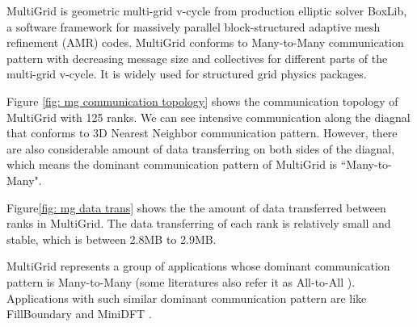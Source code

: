 \documentclass[conference]{IEEEtran}
\begin{document}
MultiGrid is geometric multi-grid v-cycle from production elliptic solver BoxLib, a software framework for massively parallel block-structured adaptive mesh refinement (AMR) codes. MultiGrid conforms to Many-to-Many communication pattern with decreasing message size and collectives for different parts of the multi-grid v-cycle. It is widely used for structured grid physics packages. 

Figure \ref{fig: mg communication topology} shows the communication topology of MultiGrid with 125 ranks. We can see intensive communication along the diagnal that conforms to 3D Nearest Neighbor communication pattern. However, there are also considerable amount of data transferring on both sides of the diagnal, which means the dominant communication pattern of MultiGrid is ``Many-to-Many".

Figure\ref{fig: mg data trans} shows the the amount of data transferred between ranks in MultiGrid. The data transferring of each rank is relatively small and stable, which is between 2.8MB to 2.9MB. 

MultiGrid represents a group of applications whose dominant communication pattern is Many-to-Many (some literatures also refer it as All-to-All \cite{roth}).  Applications with such similar dominant communication pattern are like FillBoundary and MiniDFT \cite{designforwardwebpage}.
\end{document}
